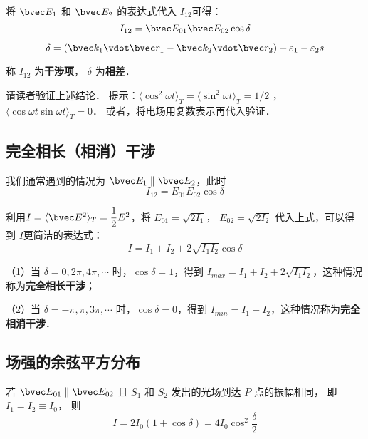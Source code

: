 将 $\bvec E_1$ 和 $ \bvec E_2$ 的表达式代入 $I_{12}$可得：
\begin{equation}
I_{12} = \bvec E_{01}\bvec E_{02} \cos\delta
\end{equation}

\begin{equation}
\delta = (\bvec k_1 \vdot \bvec r_1 - \bvec k_2 \vdot \bvec r_2 ) + \varepsilon_1 - \varepsilon_2 s
\end{equation}

称 $ I_{12} $ 为\textbf{干涉项}， $ \delta $ 为\textbf{相差}．
\begin{exercise}{}
请读者验证上述结论． 提示：$\langle \cos ^2 \omega t \rangle _T = \langle \sin ^2 \omega t \rangle _T = 1/2 $ ， $ \langle \cos \omega t \sin \omega t \rangle_T =0 $． 或者，将电场用复数表示再代入验证．
\end{exercise}

\subsection{完全相长（相消）干涉}
我们通常遇到的情况为 $\bvec E_1 \parallel \bvec E_2$，此时
\begin{equation}
 I_{12} = E_{01} E_{02}\cos\delta
\end{equation}

利用$ I = \langle \bvec E^2 \rangle _T = \dfrac{1}{2}E^2$，将 $ E_{ 01} = \sqrt{2I_1}$， $ E_{ 02} = \sqrt{2I_2}$  代入上式，可以得到 $ I $更简洁的表达式：
\begin{equation}
 I = I_1 + I_2 + 2\sqrt{I_1 I_2}\cos\delta
\end{equation}

（1）当 $\delta = 0, 2\pi, 4\pi, \cdots$ 时，$\cos \delta = 1$，得到 $ I_{max} = I_1 + I_2 +2\sqrt{I_1 I_2}$，这种情况称为\textbf{完全相长干涉}；

（2）当 $\delta = -\pi, \pi, 3\pi, \cdots$ 时，$\cos \delta = 0$，得到 $ I_{min} = I_1 + I_2 $，这种情况称为\textbf{完全相消干涉}．

\subsection{场强的余弦平方分布}

若 $ \bvec E_{01} \parallel \bvec E_{02} $ 且 $S_1$ 和 $S_2$ 发出的光场到达 $ P $ 点的振幅相同， 即 $ I_1 = I_2 \equiv I_0 $， 则
\begin{equation}
 I = 2 I_0 ( 1 + \cos\delta ) = 4 I_0 \cos ^2\dfrac { \delta } { 2 } 
\end{equation}

